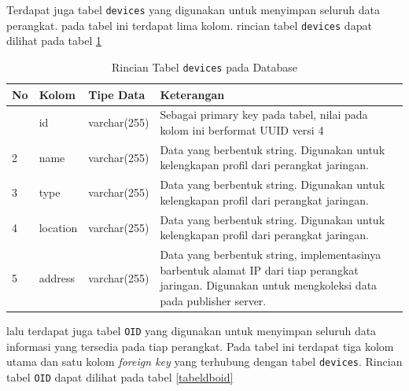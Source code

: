     	Terdapat juga tabel \texttt{devices} yang digunakan untuk menyimpan seluruh data perangkat. pada tabel ini terdapat lima kolom. rincian tabel \texttt{devices} dapat dilihat pada tabel \ref{tabeldbdevices}
    	
    	\begin{longtable}{|p{}|p{}|p{}|p{}|} %
    		
    		\caption{Rincian Tabel \texttt{devices} pada Database} \label{tabeldbdevices} \\
    		\hline
    		\textbf{No} & \textbf{Kolom} & \textbf{Tipe Data} & \textbf{Keterangan} \\ \hline
    		\endhead
    		\endfoot
    		\endlastfoot
    		1 & id & varchar(255) & Sebagai primary key pada tabel, nilai pada kolom ini berformat UUID versi 4 \\ \hline
    		2 & name & varchar(255) & Data yang berbentuk string. Digunakan untuk kelengkapan profil dari perangkat jaringan. \\ \hline
    		3 & type & varchar(255) & Data yang berbentuk string. Digunakan untuk kelengkapan profil dari perangkat jaringan. \\ \hline
    		4 & location & varchar(255) & Data yang berbentuk string. Digunakan untuk kelengkapan profil dari perangkat jaringan. \\ \hline
    		5 & address & varchar(255) & Data yang berbentuk string, implementasinya barbentuk alamat IP dari tiap perangkat jaringan. Digunakan untuk mengkoleksi data pada publisher server. \\ \hline
    	\end{longtable}
    	
    	lalu terdapat juga tabel \texttt{OID} yang digunakan untuk menyimpan seluruh data informasi yang tersedia pada tiap perangkat. Pada tabel ini terdapat tiga kolom utama dan satu kolom \textit{foreign key} yang terhubung dengan tabel \texttt{devices}. Rincian tabel \texttt{OID} dapat dilihat pada tabel \ref{tabeldboid}
    	
